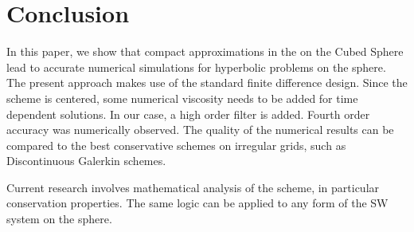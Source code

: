 
\section{Conclusion}
In this paper, we show that compact approximations in the
on the Cubed Sphere lead to accurate numerical simulations
for hyperbolic problems on the sphere.
The present approach makes use 
of the standard finite difference design.
Since the scheme is centered, some numerical viscosity
needs to be added for time dependent solutions.
In our case, a high order filter is added.
Fourth order accuracy was numerically observed.
The quality of the numerical results can be compared
to the best conservative schemes on irregular grids, such as Discontinuous Galerkin schemes.

Current research involves mathematical analysis
of the scheme, in particular conservation properties.
The same logic can be applied to any form
of the SW system on the sphere.




